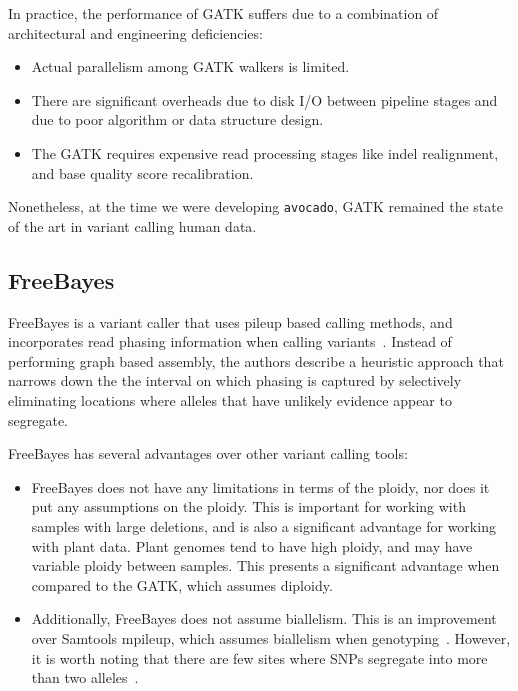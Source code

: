 \documentclass{acm_proc_article-sp}
\begin{document}
In practice, the performance of GATK suffers due to a combination of architectural
and engineering deficiencies:

\begin{itemize}
\item Actual parallelism among GATK walkers is limited.
\item There are significant overheads due to disk I/O between pipeline stages and due
to poor algorithm or data structure design.
\item The GATK requires expensive read processing stages like indel realignment, and base quality score recalibration.
\end{itemize}

Nonetheless, at the time we were developing \texttt{avocado}, GATK remained the
state of the art in variant calling human data.

\subsection{FreeBayes}
\label{sec:freebayes}

FreeBayes is a variant caller that uses pileup based calling methods, and incorporates read phasing information when calling
variants~\cite{garrison12}. Instead of performing graph based assembly, the authors describe a heuristic approach that narrows
down the the interval on which phasing is captured by selectively eliminating locations where alleles that have unlikely evidence
appear to segregate.

FreeBayes has several advantages over other variant calling tools:

\begin{itemize}
\item FreeBayes does not have any limitations in terms of the ploidy, nor does it put any assumptions on the ploidy. This
is important for working with samples with large deletions, and is also a significant advantage for working with plant data. Plant
genomes tend to have high ploidy, and may have variable ploidy between samples. This presents a significant advantage
when compared to the GATK, which assumes diploidy.
\item Additionally, FreeBayes does not assume biallelism. This is an improvement over Samtools mpileup, which assumes
biallelism when genotyping~\cite{li11}. However, it is worth noting that there are few sites where SNPs segregate into more than
two alleles~\cite{kruglyak97}.
\end{itemize}
\end{document}
